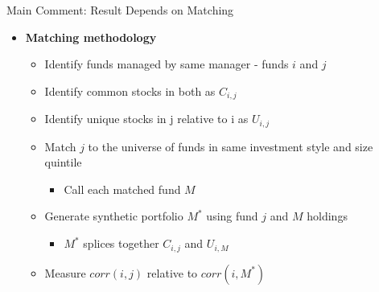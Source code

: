 \documentclass[12pt, aspectratio = 169%
]{beamer}
\newcommand{\1}{{\mathbbm{1}}}
\begin{document}
\begin{frame}{Main Comment: Result Depends on Matching}
\begin{itemize}
	\item \textbf{ Matching methodology }
	\begin{itemize} \itemsep1ex
		\item  Identify funds managed by same manager - funds $i$ and $j$
		\item  Identify common stocks in both as $C_{i,j}$
		\item  Identify unique stocks in j relative to i as $U_{i,j}$
		\item  Match $j$ to the universe of funds in same investment style and size quintile 
			\begin{itemize} 
				\item Call each matched fund $M$
			\end{itemize}
		\item  Generate synthetic portfolio $M^*$ using fund $j$ and $M$ holdings
			\begin{itemize} 
				\item $M^*$ splices together $C_{i,j}$ and $U_{i,M}$
			\end{itemize}
		\item  Measure $corr(i,j)$ relative to $corr(i,M^*)$
	\end{itemize}
\end{itemize}
\end{frame}		
\end{document}
